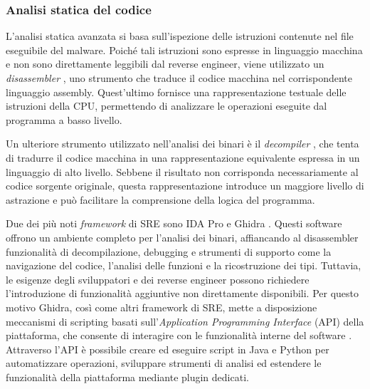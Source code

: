 
\subsubsection{Analisi statica del codice}

L'analisi statica avanzata si basa sull'ispezione delle istruzioni contenute nel file eseguibile del malware. Poiché tali istruzioni sono espresse in linguaggio macchina e non sono direttamente leggibili dal reverse engineer, viene utilizzato un \emph{disassembler} \cite{sikorski2012malware}, uno strumento che traduce il codice macchina nel corrispondente linguaggio assembly. Quest'ultimo fornisce una rappresentazione testuale delle istruzioni della CPU, permettendo di analizzare le operazioni eseguite dal programma a basso livello.  %

Un ulteriore strumento utilizzato nell'analisi dei binari è il \emph{decompiler} \cite{sikorski2012malware}, che tenta di tradurre il codice macchina in una rappresentazione equivalente espressa in un linguaggio di alto livello. Sebbene il risultato non corrisponda necessariamente al codice sorgente originale, questa rappresentazione introduce un maggiore livello di astrazione e può facilitare la comprensione della logica del programma.

Due dei più noti \emph{framework} di SRE sono IDA Pro e Ghidra \cite{sikorski2012malware}. Questi software offrono un ambiente completo per l'analisi dei binari, affiancando al disassembler funzionalità di decompilazione, debugging e strumenti di supporto come la navigazione del codice, l'analisi delle funzioni e la ricostruzione dei tipi. Tuttavia, le esigenze degli sviluppatori e dei reverse engineer possono richiedere l'introduzione di funzionalità aggiuntive non direttamente disponibili. Per questo motivo Ghidra, così come altri framework di SRE, mette a disposizione meccanismi di scripting basati sull'\emph{Application Programming Interface} (API) della piattaforma, che consente di interagire con le funzionalità interne del software \cite{nance2026ghidrabook}. Attraverso l'API è possibile creare ed eseguire script in Java e Python per automatizzare operazioni, sviluppare strumenti di analisi ed estendere le funzionalità della piattaforma mediante plugin dedicati. %


